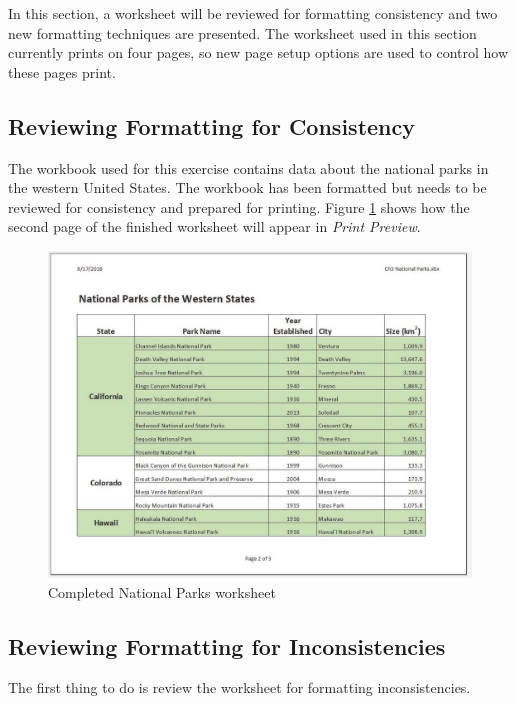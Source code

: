 In this section, a worksheet will be reviewed for formatting consistency and two new formatting techniques are presented. The worksheet used in this section currently prints on four pages, so new page setup options are used to control how these pages print. 

\subsection{Reviewing Formatting for Consistency}

The workbook used for this exercise contains data about the national parks in the western United States. The workbook has been formatted but needs to be reviewed for consistency and prepared for printing. Figure \ref{03:fig26} shows how the second page of the finished worksheet will appear in \textit{Print Preview}.

\begin{figure}[H]
	\centering
	\includegraphics[width=\maxwidth{.95\linewidth}]{gfx/ch03_fig26}
	\caption{Completed National Parks worksheet}
	\label{03:fig26}
\end{figure}

\subsection{Reviewing Formatting for Inconsistencies}

The first thing to do is review the worksheet for formatting inconsistencies.

